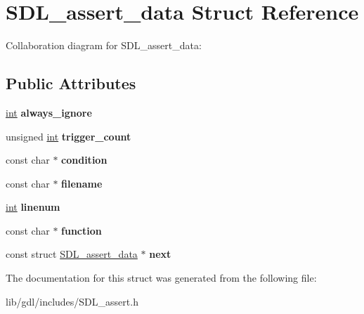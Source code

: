 \hypertarget{struct_s_d_l__assert__data}{}\section{S\+D\+L\+\_\+assert\+\_\+data Struct Reference}
\label{struct_s_d_l__assert__data}


Collaboration diagram for S\+D\+L\+\_\+assert\+\_\+data\+:
\subsection*{Public Attributes}
\begin{DoxyCompactItemize}
\item 
\hypertarget{struct_s_d_l__assert__data_ac8997040e60dd538facd3604f0498dd4}{}\hyperlink{_s_d_l__thread_8h_a6a64f9be4433e4de6e2f2f548cf3c08e}{int} {\bfseries always\+\_\+ignore}\label{struct_s_d_l__assert__data_ac8997040e60dd538facd3604f0498dd4}

\item 
\hypertarget{struct_s_d_l__assert__data_ac3e02d5e1ed06d11f7e49b6d652655d6}{}unsigned \hyperlink{_s_d_l__thread_8h_a6a64f9be4433e4de6e2f2f548cf3c08e}{int} {\bfseries trigger\+\_\+count}\label{struct_s_d_l__assert__data_ac3e02d5e1ed06d11f7e49b6d652655d6}

\item 
\hypertarget{struct_s_d_l__assert__data_aa2e21779fd9c5fd035c6deabe8aa4325}{}const char $\ast$ {\bfseries condition}\label{struct_s_d_l__assert__data_aa2e21779fd9c5fd035c6deabe8aa4325}

\item 
\hypertarget{struct_s_d_l__assert__data_ac4ae13a8034710658976e462a508ed39}{}const char $\ast$ {\bfseries filename}\label{struct_s_d_l__assert__data_ac4ae13a8034710658976e462a508ed39}

\item 
\hypertarget{struct_s_d_l__assert__data_aec495b21ff71db1226eff0e6d5db333a}{}\hyperlink{_s_d_l__thread_8h_a6a64f9be4433e4de6e2f2f548cf3c08e}{int} {\bfseries linenum}\label{struct_s_d_l__assert__data_aec495b21ff71db1226eff0e6d5db333a}

\item 
\hypertarget{struct_s_d_l__assert__data_a437899d4b1faaab73d14096374a5a18b}{}const char $\ast$ {\bfseries function}\label{struct_s_d_l__assert__data_a437899d4b1faaab73d14096374a5a18b}

\item 
\hypertarget{struct_s_d_l__assert__data_a8737ef791c8f3f1f4db4c8f627543936}{}const struct \hyperlink{struct_s_d_l__assert__data}{S\+D\+L\+\_\+assert\+\_\+data} $\ast$ {\bfseries next}\label{struct_s_d_l__assert__data_a8737ef791c8f3f1f4db4c8f627543936}

\end{DoxyCompactItemize}


The documentation for this struct was generated from the following file\+:\begin{DoxyCompactItemize}
\item 
lib/gdl/includes/S\+D\+L\+\_\+assert.\+h\end{DoxyCompactItemize}
